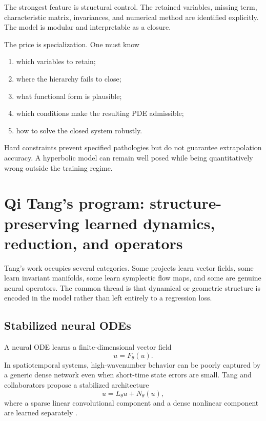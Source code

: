 \documentclass[11pt]{article}
\begin{document}
The strongest feature is structural control. The retained variables, missing term, characteristic matrix, invariances, and numerical method are identified explicitly. The model is modular and interpretable as a closure.

The price is specialization. One must know
\begin{enumerate}
  \item which variables to retain;
  \item where the hierarchy fails to close;
  \item what functional form is plausible;
  \item which conditions make the resulting PDE admissible;
  \item how to solve the closed system robustly.
\end{enumerate}

Hard constraints prevent specified pathologies but do not guarantee extrapolation accuracy. A hyperbolic model can remain well posed while being quantitatively wrong outside the training regime.

\section{Qi Tang's program: structure-preserving learned dynamics, reduction, and operators}

Tang's work occupies several categories. Some projects learn vector fields, some learn invariant manifolds, some learn symplectic flow maps, and some are genuine neural operators. The common thread is that dynamical or geometric structure is encoded in the model rather than left entirely to a regression loss.

\subsection{Stabilized neural ODEs}

A neural ODE learns a finite-dimensional vector field
\[
 \dot u=F_\theta(u).
\]
In spatiotemporal systems, high-wavenumber behavior can be poorly captured by a generic dense network even when short-time state errors are small. Tang and collaborators propose a stabilized architecture
\begin{equation}
 \dot u=L_\theta u+N_\theta(u),
 \label{eq:snode}
\end{equation}
where a sparse linear convolutional component and a dense nonlinear component are learned separately \citep{linot2023stabilized}.
\end{document}
